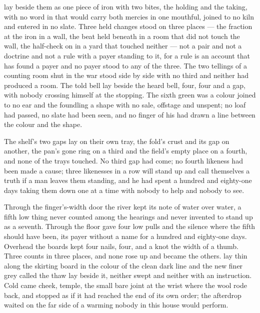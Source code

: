  lay beside them as one piece of iron with two bites, the holding and the taking, with no word in  that would carry both mercies in one mouthful, joined to no kiln and entered in no slate. Three held changes stood on three places --- the fraction at the iron in a wall, the beat held beneath  in a room that did not touch the wall, the half-check on  in a yard that touched neither --- not a pair and not a doctrine and not a rule with a payer standing to it, for a rule is an account that has found a payer and no payer stood to any of the three. The two tellings of a counting room shut in the war stood side by side with no third and neither had produced a room. The told bell lay beside the heard bell, four, four and a gap, with nobody crossing himself at the stopping. The sixth green was a colour joined to no ear and the foundling a shape with no sale, offstage and unspent; no loaf had passed, no slate had been seen, and no finger of his had drawn a line between the colour and the shape.

The shelf's two gaps lay on their own tray, the fold's crust and its gap on another, the pan's gone ring on a third and the field's empty place on a fourth, and none of the trays touched. No third gap had come; no fourth likeness had been made a cause; three likenesses in a row will stand up and call themselves a truth if a man leaves them standing, and he had spent a hundred and eighty-one days taking them down one at a time with nobody to help and nobody to see.

Through the finger's-width door the river kept its note of water over water, a fifth low thing never counted among the hearings and never invented to stand up as a seventh. Through the floor  gave four low pulls and the silence where the fifth should have been, its payer without a name for a hundred and eighty-one days. Overhead the boards kept four nails, four, and a knot the width of a thumb. Three counts in three places, and none rose up and became the others.  lay thin along the skirting board in the colour of the clean dark line and the new finer grey called the thaw lay beside it, neither swept and neither with an instruction. Cold came cheek, temple, the small bare joint at the wrist where the wool rode back, and stopped as if it had reached the end of its own order; the afterdrop waited on the far side of a warming nobody in this house would perform.

